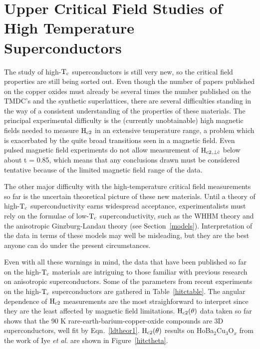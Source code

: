 \section{Upper Critical Field Studies of High Temperature 
Superconductors}
\label{hitc}

        The study of high-$\rm  T_c$ superconductors is  still very new, so
the critical field properties are still  being sorted out.  Even though the
number  of papers published  on the copper  oxides  must already be several
times the number published on the  TMDC's  and the synthetic superlattices,
there  are several difficulties   standing  in   the  way  of a  consistent
understanding   of  the   properties  of  these  materials.   The principal
experimental   difficulty is  the  (currently  unobtainable) high  magnetic
fields needed to measure $\rm H_{c2}$ in an  extensive temperature range, a
problem which is   exacerbated  by the quite broad  transitions  seen in  a
magnetic  field.   Even pulsed  magnetic  field   experiments  do not allow
measurement   of  $\rm   H_{c2,   \perp   \hat{c}}$  below  about    t    =
0.85,\cite{orlando87a,sakakibara87} which means  that any conclusions drawn
must be considered tentative because of the limited magnetic field range of
the data.

        The other major difficulty with the high-temperature critical field
measurements  so  far is  the uncertain  theoretical picture of  these  new
materials.  Until  a theory  of   high-$\rm  T_c$  superconductivity  earns
widespread  acceptance,  experimentalists must   rely  on  the  formulae of
low-$\rm  T_c$   superconductivity,  such  as  the   WHHM  theory   and the
anisotropic     Ginzburg-Landau    theory   (see     Section~\ref{models}).
Interpretation of the data in terms of these models may well be misleading,
but they are the best anyone can do under the present circumstances.

        Even  with all  these warnings  in mind, the  data  that have  been
published  so far on the  high-$\rm T_c$ materials  are intriguing to those
familiar  with previous  research  on anisotropic superconductors.  Some of
the    parameters  from   recent    experiments  on   the   high-$\rm  T_c$
superconductors are   gathered  in   Table~\ref{hitctable}.    The  angular
dependence of $\rm H_{c2}$  measurements  are the  most straighforward   to
interpret since they are the least affected by magnetic  field limitations.
$\rm  H_{c2}(\theta)$  data taken      so    far  shows  that  the     90 K
rare-earth-barium-copper-oxide compounds  are 3D superconductors,  well fit
by     Eqn.~\ref{ldtheor1}.      $\rm       H_{c2}(\theta)$    results   on
HoBa$_2$Cu$_3$O$_x$ from the work  of   Iye {\em et  al.\/}  are  shown  in
Figure~\ref{hitctheta}.

